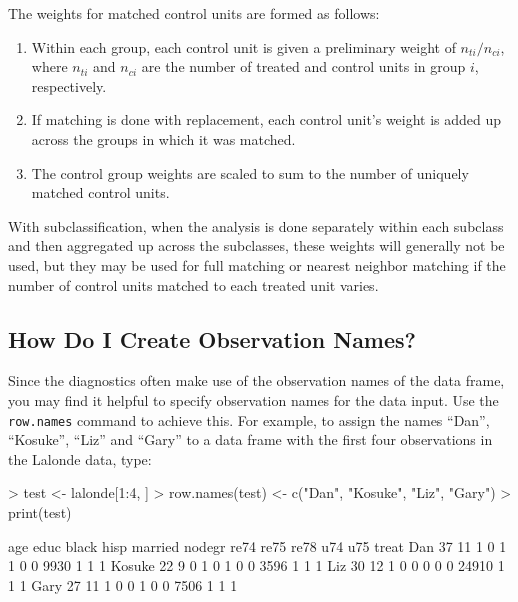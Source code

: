 \documentclass[oneside,letterpaper,titlepage]{article}
\begin{document}
The weights for matched control units are formed as follows:
\begin{enumerate}
\item Within each group, each control unit is given a preliminary
  weight of $n_{ti}/n_{ci}$, where $n_{ti}$ and $n_{ci}$ are the
  number of treated and control units in group $i$, respectively.
\item If matching is done with replacement, each control unit's weight
  is added up across the groups in which it was matched.
\item The control group weights are scaled to sum to the number of
  uniquely matched control units.
\end{enumerate}

With subclassification, when the analysis is done separately within
each subclass and then aggregated up across the subclasses, these
weights will generally not be used, but they may be used for full
matching or nearest neighbor matching if the number of control units
matched to each treated unit varies.

\subsection{How Do I Create Observation Names?}
\label{rnames}

Since the diagnostics often make use of the observation names of the
data frame, you may find it helpful to specify observation names for
the data input.  Use the \texttt{row.names} command to achieve this.
For example, to assign the names ``Dan'', ``Kosuke'', ``Liz'' and
``Gary'' to a data frame with the first four observations in the
Lalonde data, type:

\begin{Schunk}
\begin{Sinput}
> test <- lalonde[1:4, ]
> row.names(test) <- c("Dan", "Kosuke", "Liz", "Gary")
> print(test)
\end{Sinput}
\begin{Soutput}
       age educ black hisp married nodegr re74 re75  re78 u74 u75 treat
Dan     37   11     1    0       1      1    0    0  9930   1   1     1
Kosuke  22    9     0    1       0      1    0    0  3596   1   1     1
Liz     30   12     1    0       0      0    0    0 24910   1   1     1
Gary    27   11     1    0       0      1    0    0  7506   1   1     1
\end{Soutput}
\end{Schunk}
\end{document}
